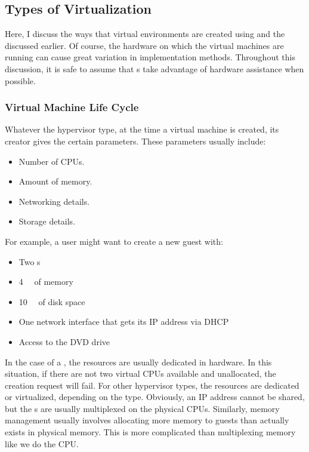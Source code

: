 \subsection{Types of Virtualization}\label{subsec:Virtualization_Types}
Here, I discuss the ways that virtual environments are created using  and the  discussed earlier.
Of course, the hardware on which the virtual machines are running can cause great variation in implementation methods.
Throughout this discussion, it is safe to assume that s take advantage of hardware assistance when possible.

\subsubsection{Virtual Machine Life Cycle}\label{subsubsec:VM_Life_Cycle}
Whatever the hypervisor type, at the time a virtual machine is created, its creator gives the  certain parameters.
These parameters usually include:
\begin{itemize}[noitemsep]
\item Number of CPUs.
\item Amount of memory.
\item Networking details.
\item Storage details.
\end{itemize}

For example, a user might want to create a new guest with:
\begin{itemize}[noitemsep]
\item Two s
\item \SI{4}{\gibi{} \byte{}} of memory
\item \SI{10}{\gibi{} \byte{}} of disk space
\item One network interface that gets its IP address via DHCP
\item Access to the DVD drive
\end{itemize}

In the case of a , the resources are usually dedicated in hardware.
In this situation, if there are not two virtual CPUs available and unallocated, the creation request will fail.
For other hypervisor types, the resources are dedicated or virtualized, depending on the type.
Obviously, an IP address cannot be shared, but the s are usually multiplexed on the physical CPUs.
Similarly, memory management usually involves allocating more memory to guests than actually exists in physical memory.
This is more complicated than multiplexing memory like we do the CPU.\@

